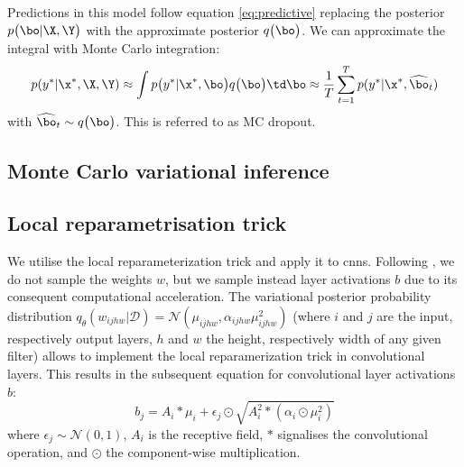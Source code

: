 Predictions in this model follow equation \eqref{eq:predictive} replacing the posterior $p \big( \bo| \X, \Y \big)$ with the approximate posterior $q \big( \bo \big)$. We can approximate the integral with Monte Carlo integration:
\begin{align} \label{eq:approx_predictive}
p(y^* | \x^*, \X, \Y) \approx 
\int p \big( y^* | \x^*, \bo \big) q \big( \bo \big) 
\td \bo
\approx \frac{1}{T} \sum_{t=1}^T p ( y^* | \x^*, \widehat{\bo}_t )
\end{align}
with $\widehat{\bo}_t \sim q \big( \bo \big)$. This is referred to as MC dropout.

\subsection{Monte  Carlo  variational  inference}
\subsection{Local  reparametrisation  trick}

We utilise the local reparameterization trick \cite{kingma2015variational} and apply it to \acp{cnn}. Following \cite{kingma2015variational,neklyudov2018variance}, we do not sample the weights $w$, but we sample instead layer activations $b$ due to its consequent computational acceleration. The variational posterior probability distribution $q_{\theta}(w_{ijhw}|\mathcal{D})=\mathcal{N}(\mu_{ijhw},\alpha_{ijhw}\mu^2_{ijhw})$ (where $i$ and $j$ are the input, respectively output layers, $h$ and $w$ the height, respectively width of any given filter) allows to implement the local reparamerization trick in convolutional layers. This results in the subsequent equation for convolutional layer activations $b$:
\begin{equation}
    b_j=A_i\ast \mu_i+\epsilon_j\odot \sqrt{A^2_i\ast (\alpha_i\odot \mu^2_i)}
\end{equation}
where $\epsilon_j \sim \mathcal{N}(0,1)$, $A_i$ is the receptive field, $\ast$ signalises the convolutional operation, and $\odot$ the component-wise multiplication.

